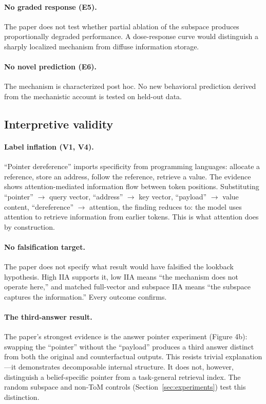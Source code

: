 \documentclass[11pt]{article}
\begin{document}
\paragraph{No graded response (E5).}
The paper does not test whether partial ablation of the subspace produces proportionally degraded performance. A dose-response curve would distinguish a sharply localized mechanism from diffuse information storage.

\paragraph{No novel prediction (E6).}
The mechanism is characterized post hoc. No new behavioral prediction derived from the mechanistic account is tested on held-out data.

\subsection{Interpretive validity}

\paragraph{Label inflation (V1, V4).}
``Pointer dereference'' imports specificity from programming languages: allocate a reference, store an address, follow the reference, retrieve a value. The evidence shows attention-mediated information flow between token positions. Substituting ``pointer'' $\rightarrow$ query vector, ``address'' $\rightarrow$ key vector, ``payload'' $\rightarrow$ value content, ``dereference'' $\rightarrow$ attention, the finding reduces to: the model uses attention to retrieve information from earlier tokens. This is what attention does by construction.

\paragraph{No falsification target.}
The paper does not specify what result would have falsified the lookback hypothesis. High IIA supports it, low IIA means ``the mechanism does not operate here,'' and matched full-vector and subspace IIA means ``the subspace captures the information.'' Every outcome confirms.

\paragraph{The third-answer result.}
The paper's strongest evidence is the answer pointer experiment (Figure 4b): swapping the ``pointer'' without the ``payload'' produces a third answer distinct from both the original and counterfactual outputs. This resists trivial explanation---it demonstrates decomposable internal structure. It does not, however, distinguish a belief-specific pointer from a task-general retrieval index. The random subspace and non-ToM controls (Section~\ref{sec:experiments}) test this distinction.
\end{document}
